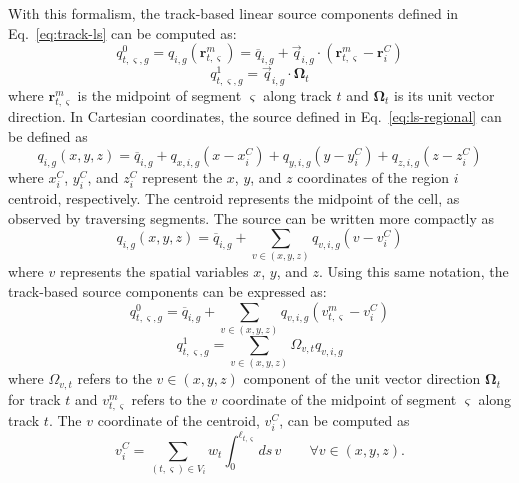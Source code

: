 With this formalism, the track-based linear source components defined in Eq.~\ref{eq:track-ls} can be computed as:
\begin{equation}
q^0_{t,\varsigma,g} = q_{i,g}(\mathbf{r}^m_{t,\varsigma}) = \overline{q}_{i,g} + \vec{q}_{i,g} \cdot \left( \mathbf{r}^m_{t,\varsigma} - \mathbf{r}^C_i \right)
\end{equation}
\begin{equation}
q^1_{t,\varsigma,g} = \vec{q}_{i,g} \cdot \mathbf{\Omega}_t
\end{equation}
where $\mathbf{r}^m_{t,\varsigma}$ is the midpoint of segment $\varsigma$ along track $t$ and $\mathbf{\Omega}_t$ is its unit vector direction. In Cartesian coordinates, the source defined in Eq.~\ref{eq:ls-regional} can be defined as
\begin{equation}
q_{i,g}(x, y, z) = \overline{q}_{i,g} + q_{x,i,g} \left( x - x^C_i \right) + q_{y,i,g} \left( y - y^C_i \right) + q_{z,i,g} \left( z - z^C_i \right)
\end{equation}
where $x^C_i$, $y^C_i$, and $z^C_i$ represent the $x$, $y$, and $z$ coordinates of the region $i$ centroid, respectively. The centroid represents the midpoint of the cell, as observed by traversing segments. The source can be written more compactly as
\begin{equation}
q_{i,g}(x, y, z) = \overline{q}_{i,g} + \sum_{v \in (x,y,z)} q_{v,i,g} \left( v - v^C_i \right)
\end{equation}
where $v$ represents the spatial variables $x$, $y$, and $z$. Using this same notation, the track-based source components can be expressed as:
\begin{equation}
q^0_{t,\varsigma,g} = \overline{q}_{i,g} + \sum_{v \in (x,y,z)} q_{v,i,g} \left( v^m_{t,\varsigma} - v^C_i \right)
\label{eq:q0-def}
\end{equation}
\begin{equation}
q^1_{t,\varsigma,g} = \sum_{v \in (x,y,z)} \Omega_{v,t} q_{v,i,g}
\label{eq:q1-def}
\end{equation}
where $\Omega_{v,t}$ refers to the $v\in(x,y,z)$ component of the unit vector direction $\mathbf{\Omega}_t$ for track $t$ and $v^m_{t,\varsigma}$ refers to the $v$ coordinate of the midpoint of segment $\varsigma$ along track $t$. The $v$ coordinate of the centroid, $v^C_i$, can be computed as
\begin{equation}
v^C_i = \sum_{(t,\varsigma) \in V_i} w_t \int_{0}^{\ell_{t,\varsigma}} ds \, v \qquad \forall v \in (x,y,z).
\label{eq:gen-centroid-int}
\end{equation}
